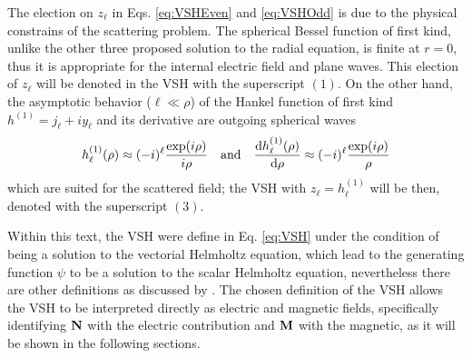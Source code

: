%
\noindent%
The election on $z_\ell$ in Eqs. \eqref{eq:VSHEven} and  \eqref{eq:VSHOdd} is due to the physical constrains of the scattering problem. The spherical Bessel function of first kind, unlike the other three proposed solution to the radial equation, is finite at $r = 0$, thus it is appropriate for the internal electric field and plane waves. This election of $z_\ell$ will be denoted in the VSH with the superscript $(1)$. On the other hand, the asymptotic behavior ($\ell\ll \rho$) of the Hankel function of first kind $h^{(1)} = j_\ell + i y_\ell$ and its derivative are outgoing spherical waves \cite{bohren_absorption_1983}
\begin{align}
h_\ell^{(1)}(\rho)\approx (-i)^\ell \frac{\exp(i\rho)}{i\rho}
\qqtext{and}
\dv{h_\ell^{(1)}(\rho)}{\rho} \approx (-i)^\ell \frac{\exp(i\rho)}{\rho}
\end{align}
which are suited for the scattered field; the VSH with $z_\ell = h^{(1)}_\ell$ will be then, denoted with the superscript $(3)$.

Within this text, the VSH were define in Eq. \eqref{eq:VSH} under the condition of being a solution to the vectorial Helmholtz equation, which lead to the generating function $\psi$ to be a solution to the scalar Helmholtz equation, nevertheless there are other definitions as discussed by \citeauthor{barrera_vector_1985} \cite{barrera_vector_1985}. The chosen definition of the VSH allows the VSH to be interpreted directly as electric and magnetic fields, specifically identifying $\vb{N}$ with the electric contribution and $\vb{M}$ with the magnetic, as it will be shown in the following sections.
